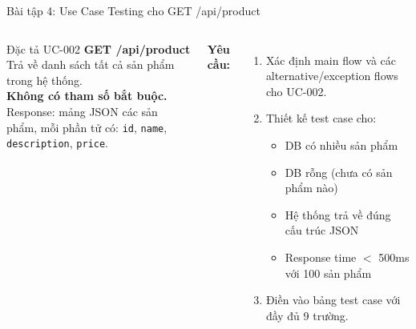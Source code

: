 \documentclass[aspectratio=169,12pt]{beamer}
\begin{document}
\begin{frame}{Bài tập 4: Use Case Testing cho GET /api/product}
  \begin{columns}
    \begin{block}{Đặc tả UC-002}
      \textbf{GET /api/product}\\[0.3em]
      Trả về danh sách tất cả sản phẩm trong hệ thống.\\[0.3em]
      \textbf{Không có tham số bắt buộc.}\\[0.3em]
      Response: mảng JSON các sản phẩm, mỗi phần tử có:
      \texttt{id}, \texttt{name}, \texttt{description}, \texttt{price}.
    \end{block}

    \textbf{Yêu cầu:}
    \begin{enumerate}
      \item Xác định main flow và các alternative/exception flows cho UC-002.
      \item Thiết kế test case cho:
        \begin{itemize}
          \item DB có nhiều sản phẩm
          \item DB rỗng (chưa có sản phẩm nào)
          \item Hệ thống trả về đúng cấu trúc JSON
          \item Response time $<$ 500ms với 100 sản phẩm
        \end{itemize}
      \item Điền vào bảng test case với đầy đủ 9 trường.
    \end{enumerate}
  \end{columns}
\end{frame}
\end{document}
